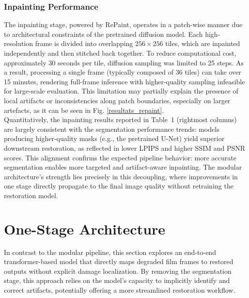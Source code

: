 \documentclass[10pt,a4paper,twocolumn,twoside]{article}
\begin{document}
\subsubsection{Inpainting Performance}
The inpainting stage, powered by RePaint, operates in a patch-wise manner due to architectural constraints of the pretrained diffusion model. Each high-resolution frame is divided into overlapping $256 \times 256$ tiles, which are inpainted independently and then stitched back together. To reduce computational cost, approximately 30 seconds per tile, diffusion sampling was limited to 25 steps. As a result, processing a single frame (typically composed of 36 tiles) can take over 15 minutes, rendering full-frame inference with higher-quality sampling infeasible for large-scale evaluation. This limitation may partially explain the presence of local artifacts or inconsistencies along patch boundaries, especially on larger artefacts, as it can be seen in Fig. \ref{resultats_repaint}.\\ 
Quantitatively, the inpainting results reported in Table~1 (rightmost columns) are largely consistent with the segmentation performance trends: models producing higher-quality masks (e.g., the pretrained U-Net) yield superior downstream restoration, as reflected in lower LPIPS and higher SSIM and PSNR scores. This alignment confirms the expected pipeline behavior: more accurate segmentation enables more targeted and artifact-aware inpainting. The modular architecture's strength lies precisely in this decoupling, where improvements in one stage directly propagate to the final image quality without retraining the restoration model.


\section{One-Stage Architecture}
In contrast to the modular pipeline, this section explores an end-to-end transformer-based model that directly maps degraded film frames to restored outputs without explicit damage localization. By removing the segmentation stage, this approach relies on the model’s capacity to implicitly identify and correct artifacts, potentially offering a more streamlined restoration workflow.
\end{document}
